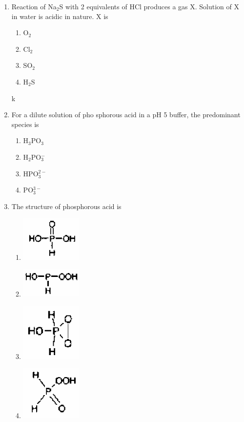 \documentclass[journal,12pt,onecolumn]{IEEEtran}
\theoremstyle{remark}
\begin{document}
\begin{enumerate}
\item Reaction of Na$_2$S with 2 equivalents of HCl produces a gas X. Solution of X in water is acidic in nature. X is
\hfill{}
\begin{multicols}{2}
\begin{enumerate}
\item O$_2$
\item Cl$_2$
\item SO$_2$
\item H$_2$S
\end{enumerate}
\end{multicols}
k
\item For a dilute solution of pho
sphorous acid in a pH 5 buffer, the predominant species is
\hfill{}
\begin{multicols}{2}
\begin{enumerate}
\item  H$_3$PO$_3$
\item  H$_2$PO$_3^-$ 
\item   HPO$_3^{2-}$
\item PO$_3^{3-}$
\end{enumerate}
\end{multicols}

\item The structure of phosphorous acid is
\hfill{}
\begin{multicols}{2}
\begin{enumerate}
\item \includegraphics[width=0.25\textwidth]{fig10.png}
\item \includegraphics[width=0.25\textwidth]{fig11.png}
\item \includegraphics[width=0.25\textwidth]{fig12.png}
\item \includegraphics[width=0.25\textwidth]{fig13.png}
\end{enumerate}
\end{multicols}


\end{enumerate}
\end{document}
